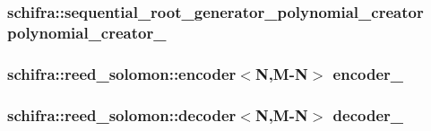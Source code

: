 \label{classefb_1_1SchifraFec_a80fe940d7742c12811d27cbb50d605dc}
\hypertarget{classefb_1_1SchifraFec_a6dd291fa5e301f1d88eba72e486c22d3}{
\subsubsection[{polynomial\_\-creator\_\-}]{\setlength{\rightskip}{0pt plus 5cm}schifra::sequential\_\-root\_\-generator\_\-polynomial\_\-creator {\bf polynomial\_\-creator\_\-}}}
\label{classefb_1_1SchifraFec_a6dd291fa5e301f1d88eba72e486c22d3}
\hypertarget{classefb_1_1SchifraFec_a48add19c7145ddef42b214f772508c0f}{
\subsubsection[{encoder\_\-}]{\setlength{\rightskip}{0pt plus 5cm}schifra::reed\_\-solomon::encoder$<$N,M-\/N$>$ {\bf encoder\_\-}}}
\label{classefb_1_1SchifraFec_a48add19c7145ddef42b214f772508c0f}
\hypertarget{classefb_1_1SchifraFec_acddab8a0f72a511d8b03ffecfe77735a}{
\subsubsection[{decoder\_\-}]{\setlength{\rightskip}{0pt plus 5cm}schifra::reed\_\-solomon::decoder$<$N,M-\/N$>$ {\bf decoder\_\-}}}
\label{classefb_1_1SchifraFec_acddab8a0f72a511d8b03ffecfe77735a}
